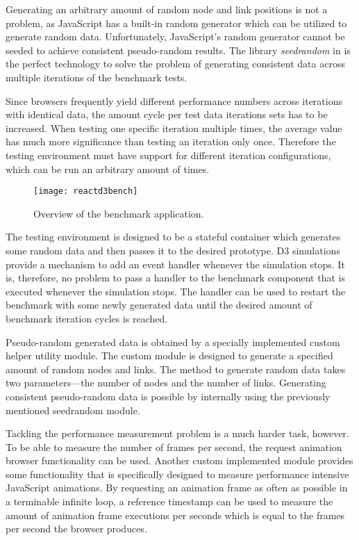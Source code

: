 Generating an arbitrary amount of random node and link positions is not a problem, as JavaScript has a built-in random generator which can be utilized to generate random data. Unfortunately, JavaScript's random generator cannot be seeded to achieve consistent pseudo-random results. The library \emph{seedrandom} in \cite{SeedRandom} is the perfect technology to solve the problem of generating consistent data across multiple iterations of the benchmark tests.

Since browsers frequently yield different performance numbers across iterations with identical data, the amount cycle per test data iterations sets has to be increased. When testing one specific iteration multiple times, the average value has much more significance than testing an iteration only once. Therefore the testing environment must have support for different iteration configurations, which can be run an arbitrary amount of times.

\begin{figure}
  \centering
  \texttt{[image: reactd3bench]}
  \caption{Overview of the benchmark application.}
  \label{fig:reactD3bench1}
\end{figure}

The testing environment is designed to be a stateful container which generates some random data and then passes it to the desired prototype. D3 simulations provide a mechanism to add an event handler whenever the simulation stops. It is, therefore, no problem to pass a handler to the benchmark component that is executed whenever the simulation stops. The handler can be used to restart the benchmark with some newly generated data until the desired amount of benchmark iteration cycles is reached.

Pseudo-random generated data is obtained by a specially implemented custom helper utility module. The custom module is designed to generate a specified amount of random nodes and links. The method to generate random data takes two parameters---the number of nodes and the number of links. Generating consistent pseudo-random data is possible by internally using the previously mentioned seedrandom module.

Tackling the performance measurement problem is a much harder task, however. To be able to measure the number of frames per second, the request animation browser functionality can be used. Another custom implemented module provides some functionality that is specifically designed to measure performance intensive JavaScript animations. By requesting an animation frame as often as possible in a terminable infinite loop, a reference timestamp can be used to measure the amount of animation frame executions per seconds which is equal to the frames per second the browser produces.

